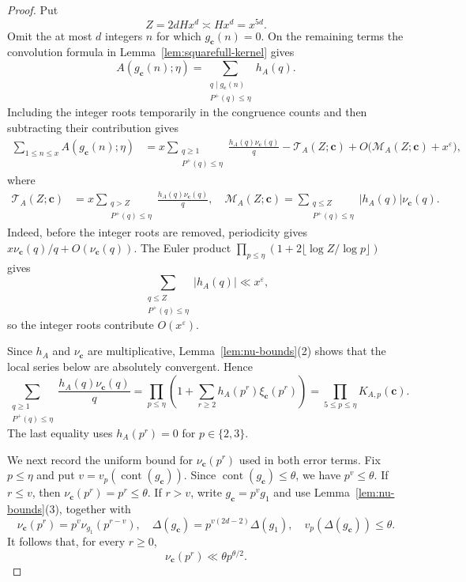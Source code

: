 \documentclass[10pt,a4paper]{amsart}
\DeclareMathOperator{\cont}{cont}
\newcommand{\cc}{\mathbf{c}}
\renewcommand{\ge}{\geqslant}
\renewcommand{\le}{\leqslant}
\begin{document}
\begin{proof}
Put
\begin{equation}\label{eq:height-cutoff}
Z=2dHx^d\asymp Hx^d=x^{5d}.
\end{equation}
Omit the at most $d$ integers $n$ for which $g_\cc(n)=0$.
On the remaining terms the convolution formula in Lemma~\ref{lem:squarefull-kernel} gives
\[
A(g_\cc(n);\eta)
=\sum_{\substack{q\mid g_\cc(n)\\P^+(q)\le\eta}}h_A(q).
\]
Including the integer roots temporarily in the congruence counts and then subtracting their contribution gives
\begin{align}\label{eq:trunc-main-err}
\sum_{1\le n\le x}A(g_\cc(n);\eta)
&=x\sum_{\substack{q\ge1\\P^+(q)\le\eta}}
\frac{h_A(q)\nu_\cc(q)}q-\mathcal T_A(Z;\cc)
+O\bigl(\mathcal M_A(Z;\cc)+x^\varepsilon\bigr),
\end{align}
where
\begin{equation}\label{eq:def-trunc-errors}
\begin{aligned}
\mathcal T_A(Z;\cc)
&=x\sum_{\substack{q>Z\\P^+(q)\le\eta}}
\frac{h_A(q)\nu_\cc(q)}q,\quad
\mathcal M_A(Z;\cc)=
\sum_{\substack{q\le Z\\P^+(q)\le\eta}}
|h_A(q)|\nu_\cc(q).
\end{aligned}
\end{equation}
Indeed, before the integer roots are removed, periodicity gives $x\nu_\cc(q)/q+O(\nu_\cc(q))$.
The Euler product $\prod_{p\le\eta}(1+2\lfloor\log Z/\log p\rfloor)$ gives
\[
\sum_{\substack{q\le Z\\P^+(q)\le\eta}}|h_A(q)|
\ll x^\varepsilon,
\]
so the integer roots contribute $O(x^\varepsilon)$.

Since $h_A$ and $\nu_\cc$ are multiplicative, Lemma~\ref{lem:nu-bounds}(2) shows that the local series below are absolutely convergent.
Hence
\begin{equation}\label{eq:trunc-euler-prod}
\sum_{\substack{q\ge1\\P^+(q)\le\eta}}
\frac{h_A(q)\nu_\cc(q)}q
=\prod_{p\le\eta}
\left(1+\sum_{r\ge2}h_A(p^r)\xi_\cc(p^r)\right)
=\prod_{5\le p\le\eta}K_{A,p}(\cc).
\end{equation}
The last equality uses $h_A(p^r)=0$ for $p\in\{2,3\}$.

We next record the uniform bound for $\nu_\cc(p^r)$ used in both error terms.
Fix $p\le\eta$ and put $v=v_p(\cont(g_\cc))$.
Since $\cont(g_\cc)\le\theta$, we have $p^v\le\theta$.
If $r\le v$, then $\nu_\cc(p^r)=p^r\le\theta$.
If $r>v$, write $g_\cc=p^v g_1$ and use Lemma~\ref{lem:nu-bounds}(3), together with
\[
\nu_\cc(p^r)=p^v\nu_{g_1}(p^{r-v}),\quad
\Delta(g_\cc)=p^{v(2d-2)}\Delta(g_1),\quad
v_p(\Delta(g_\cc))\le\theta.
\]
It follows that, for every $r\ge0$,
\begin{equation}\label{eq:nu-smallp-bound}
\nu_\cc(p^r)\ll\theta p^{\theta/2}.
\end{equation}


\end{proof}
\end{document}
